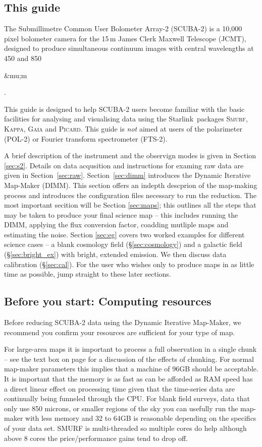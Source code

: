 \documentclass[twoside,11pt]{article}
\newcommand{\micron}{\mbox{\,${\umu}$m}}            %
\newcounter{box}
\newcommand{\htmladdnormallink}[2]{#1}
\newcommand{\xref}[3]{#1}
\newcommand{\xlabel}[1]{}
\renewcommand{\_}{\texttt{\symbol{95}}}
\newcommand{\starlink}{\htmladdnormallink{Starlink}{http://starlink.jach.hawaii.edu}}
\newcommand{\Kappa}{\xref{\textsc{Kappa}}{sun95}{}}
\newcommand{\gaia}{\xref{\textsc{Gaia}}{sun214}{}}
\newcommand{\picard}{\xref{\textsc{Picard}}{sun231}{}}
\newcommand{\smurf}{\xref{\textsc{Smurf}}{sun258}{}}
\renewcommand{\micron}{\begin{rawhtml}&mu;m\end{rawhtml}}
\begin{document}
\subsection{\xlabel{using_guide}This guide}
The Submillimetre Common User Bolometer Array-2 (SCUBA-2) is a 10,000 pixel bolometer camera for the 15\,m James Clerk Maxwell Telescope (JCMT), designed to produce simultaneous continuum images with
central wavelengths at 450 and 850\micron.

This guide is designed to help SCUBA-2 users become familiar with the basic facilities for analysing and visualising data using the \starlink\ packages \smurf \cite{smurf}, \Kappa \cite{kappa}, \gaia \cite{gaia} and \picard \cite{picard}.  This guide is {\em not} aimed at users of the polarimeter (POL-2) or Fourier transform spectrometer (FTS-2).

A brief description of the instrument and the observign modes is given in Section \ref{sec:s2}. Details on data acqusition and instructions for examing raw data are given in Section~\ref{sec:raw}. Section~\ref{sec:dimm} introduces the Dynamic Iterative Map-Maker (DIMM). This section offers an indepth descprion of the map-making process and introduces the configuration files necessary to run the reduction. The most important secition will be Section \ref{sec:maps}; this outlines all the steps that may be taken to produce your final science map -- this includes running the DIMM, applying the flux conversion factor, coadding mutliple maps and estimating the noise.  Section \ref{sec:eg} covers two worked examples for different science cases -- a blank cosmology field (\S\ref{sec:cosmology}) and a galactic field (\S\ref{sec:bright_ex}) with bright, extended emission. We then discuss data calibration (\S\ref{sec:cal}). For the user who wishes only to produce maps in as little time as possible, jump straight to these later sections.

\subsection{\xlabel{computing}Before you start: Computing resources}
Before reducing SCUBA-2 data using the Dynamic Iterative Map-Maker, we recommend you confirm your resources are sufficient for your type of map. 

For large-area maps it is important to process a full observation in a single chunk -- see the text box on page \pageref{page:text} for a discussion of the effects of chunking. For normal map-maker parameters this implies that a machine of 96GB should be acceptable. It is important that the memory is as fast as can be afforded as RAM speed has a direct linear effect on processing time given that the time-series data are continually being funneled through the CPU.  For blank field surveys, data that only use 850 microns, or smaller regions of the sky you can usefully run the map-maker with less memory and 32 to 64GB is reasonable depending on the specifics of your data set. SMURF is multi-threaded so multiple cores do help although above 8 cores the price/performance gains tend to drop off.
\end{document}
